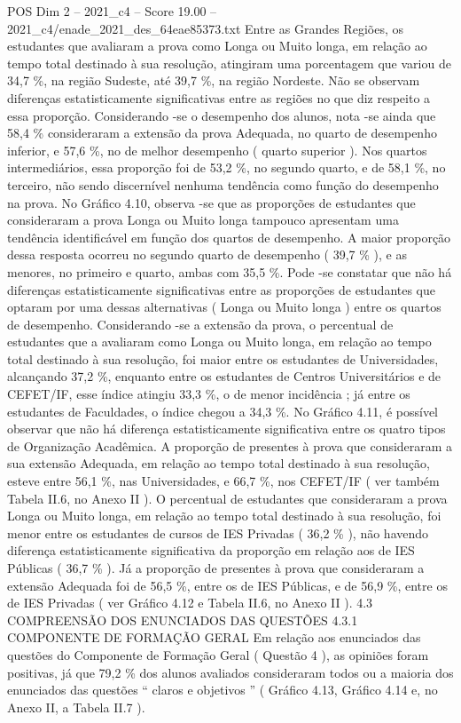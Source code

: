 \begin{textsample}{POS Dim 2 – 2021\_c4 – Score 19.00 – 2021\_c4/enade\_2021\_des\_64eae85373.txt}
Entre as Grandes Regiões, os estudantes que avaliaram a prova como Longa ou Muito longa, em relação ao tempo total destinado à sua resolução, atingiram uma porcentagem que variou de 34,7 \%, na região Sudeste, até 39,7 \%, na região Nordeste.
Não se observam diferenças estatisticamente significativas entre as regiões no que diz respeito a essa proporção.
Considerando -se o desempenho dos alunos, nota -se ainda que 58,4 \% consideraram a extensão da prova Adequada, no quarto de desempenho inferior, e 57,6 \%, no de melhor desempenho ( quarto superior ).
Nos quartos intermediários, essa proporção foi de 53,2 \%, no segundo quarto, e de 58,1 \%, no terceiro, não sendo discernível nenhuma tendência como função do desempenho na prova.
No Gráfico 4.10, observa -se que as proporções de estudantes que consideraram a prova Longa ou Muito longa tampouco apresentam uma tendência identificável em função dos quartos de desempenho.
A maior proporção dessa resposta ocorreu no segundo quarto de desempenho ( 39,7 \% ), e as menores, no primeiro e quarto, ambas com 35,5 \%.
Pode -se constatar que não há diferenças estatisticamente significativas entre as proporções de estudantes que optaram por uma dessas alternativas ( Longa ou Muito longa ) entre os quartos de desempenho.
Considerando -se a extensão da prova, o percentual de estudantes que a avaliaram como Longa ou Muito longa, em relação ao tempo total destinado à sua resolução, foi maior entre os estudantes de Universidades, alcançando 37,2 \%, enquanto entre os estudantes de Centros Universitários e de CEFET/IF, esse índice atingiu 33,3 \%, o de menor incidência ; já entre os estudantes de Faculdades, o índice chegou a 34,3 \%.
No Gráfico 4.11, é possível observar que não há diferença estatisticamente significativa entre os quatro tipos de Organização Acadêmica.
A proporção de presentes à prova que consideraram a sua extensão Adequada, em relação ao tempo total destinado à sua resolução, esteve entre 56,1 \%, nas Universidades, e 66,7 \%, nos CEFET/IF ( ver também Tabela II.6, no Anexo II ).
O percentual de estudantes que consideraram a prova Longa ou Muito longa, em relação ao tempo total destinado à sua resolução, foi menor entre os estudantes de cursos de IES Privadas ( 36,2 \% ), não havendo diferença estatisticamente significativa da proporção em relação aos de IES Públicas ( 36,7 \% ).
Já a proporção de presentes à prova que consideraram a extensão Adequada foi de 56,5 \%, entre os de IES Públicas, e de 56,9 \%, entre os de IES Privadas ( ver Gráfico 4.12 e Tabela II.6, no Anexo II ). 4.3 COMPREENSÃO DOS ENUNCIADOS DAS QUESTÕES 4.3.1 COMPONENTE DE FORMAÇÃO GERAL Em relação aos enunciados das questões do Componente de Formação Geral ( Questão 4 ), as opiniões foram positivas, já que 79,2 \% dos alunos avaliados consideraram todos ou a maioria dos enunciados das questões “ claros e objetivos ” ( Gráfico 4.13, Gráfico 4.14 e, no Anexo II, a Tabela II.7 ).

\end{textsample}
